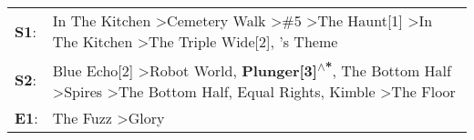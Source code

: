 \begin{supertabular}{p{0.03\textwidth}p{0.92\textwidth}}
 \textbf{S1}:  &                                                                              In The Kitchen\textsuperscript{} \textgreater \enspace Cemetery Walk\textsuperscript{} \textgreater \enspace \#5\textsuperscript{} \textgreater \enspace The Haunt[1]\textsuperscript{} \textgreater \enspace In The Kitchen\textsuperscript{} \textgreater \enspace The Triple Wide[2]\textsuperscript{}, 's Theme\textsuperscript{}  \enspace  \\
 \textbf{S2}:  &  Blue Echo[2]\textsuperscript{} \textgreater \enspace Robot World\textsuperscript{}, \enspace \textbf{Plunger[3]\textsuperscript{$\wedge$*}}, \enspace The Bottom Half\textsuperscript{} \textgreater \enspace Spires\textsuperscript{} \textgreater \enspace The Bottom Half\textsuperscript{}, \enspace Equal Rights\textsuperscript{}, \enspace Kimble\textsuperscript{} \textgreater \enspace The Floor\textsuperscript{}  \enspace  \\
 \textbf{E1}:  &                                                                                                                                                                                                                                                                                                                                                      The Fuzz\textsuperscript{} \textgreater \enspace Glory\textsuperscript{}  \enspace  \\
\end{supertabular}
